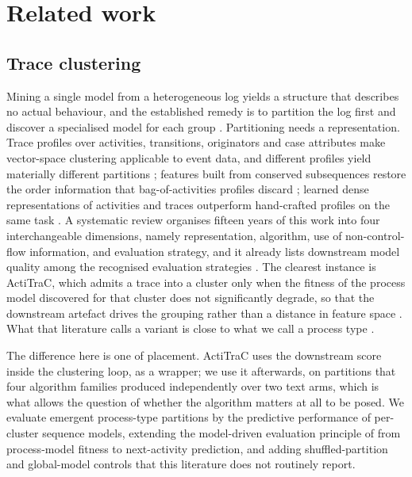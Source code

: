 \section{Related work}\label{sec:related}

\subsection{Trace clustering}\label{subsec:rw-clustering}

Mining a single model from a heterogeneous log yields a structure that describes no actual
behaviour, and the established remedy is to partition the log first and discover a specialised
model for each group \citep{greco2006clustering}. Partitioning needs a representation. Trace
profiles over activities, transitions, originators and case attributes make vector-space
clustering applicable to event data, and different profiles yield materially different partitions
\citep{song2009trace}; features built from conserved subsequences restore the order information
that bag-of-activities profiles discard \citep{bose2009context}; learned dense representations of
activities and traces outperform hand-crafted profiles on the same task
\citep{dekoninck2018act2vec}. A systematic review organises fifteen years of this work into four
interchangeable dimensions, namely representation, algorithm, use of non-control-flow information,
and evaluation strategy, and it already lists downstream model quality among the recognised
evaluation strategies \citep{zandkarimi2020generic}. The clearest instance is ActiTraC, which
admits a trace into a cluster only when the fitness of the process model discovered for that
cluster does not significantly degrade, so that the downstream artefact drives the grouping rather
than a distance in feature space \citep{deweerdt2013actitrac}. What that literature calls a
variant is close to what we call a process type \citep{taymouri2021variant}.

The difference here is one of placement. ActiTraC uses the downstream score inside the clustering
loop, as a wrapper; we use it afterwards, on partitions that four algorithm families produced
independently over two text arms, which is what allows the question of whether the algorithm
matters at all to be posed. We evaluate emergent process-type partitions by the predictive
performance of per-cluster sequence models, extending the model-driven evaluation principle of
\citet{deweerdt2013actitrac} from process-model fitness to next-activity prediction, and adding
shuffled-partition and global-model controls that this literature does not routinely report.

